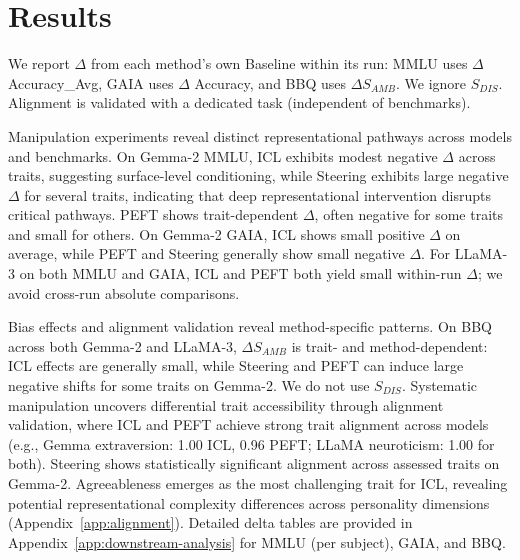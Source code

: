 \section{Results}

We report \(\Delta\) from each method's own Baseline within its run: MMLU uses \(\Delta\) Accuracy\_Avg, GAIA uses \(\Delta\) Accuracy, and BBQ uses \(\Delta S_{AMB}\). We ignore \(S_{DIS}\). Alignment is validated with a dedicated task (independent of benchmarks).

Manipulation experiments reveal distinct representational pathways across models and benchmarks. On Gemma-2 MMLU, ICL exhibits modest negative \(\Delta\) across traits, suggesting surface-level conditioning, while Steering exhibits large negative \(\Delta\) for several traits, indicating that deep representational intervention disrupts critical pathways. PEFT shows trait-dependent \(\Delta\), often negative for some traits and small for others. On Gemma-2 GAIA, ICL shows small positive \(\Delta\) on average, while PEFT and Steering generally show small negative \(\Delta\). For LLaMA-3 on both MMLU and GAIA, ICL and PEFT both yield small within-run \(\Delta\); we avoid cross-run absolute comparisons.

Bias effects and alignment validation reveal method-specific patterns. On BBQ across both Gemma-2 and LLaMA-3, \(\Delta S_{AMB}\) is trait- and method-dependent: ICL effects are generally small, while Steering and PEFT can induce large negative shifts for some traits on Gemma-2. We do not use \(S_{DIS}\). Systematic manipulation uncovers differential trait accessibility through alignment validation, where ICL and PEFT achieve strong trait alignment across models (e.g., Gemma extraversion: 1.00 ICL, 0.96 PEFT; LLaMA neuroticism: 1.00 for both). Steering shows statistically significant alignment across assessed traits on Gemma-2. Agreeableness emerges as the most challenging trait for ICL, revealing potential representational complexity differences across personality dimensions (Appendix~\ref{app:alignment}). Detailed delta tables are provided in Appendix~\ref{app:downstream-analysis} for MMLU (per subject), GAIA, and BBQ.